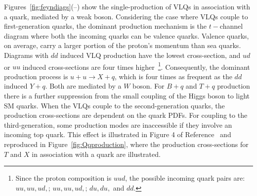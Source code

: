 Figures~\ref{fig:feyndiags}(--) show the single-production of VLQs in association with a quark, mediated by a weak boson. Considering the case where VLQs couple to first-generation quarks, the dominant production mechanism is the $t-$channel diagram where both the incoming quarks can be valence quarks. Valence quarks, on average, carry a larger portion of the proton's momentum than sea quarks. Diagrams with $dd$ induced VLQ production have the lowest cross-section, and $ud$ or $uu$ induced cross-sections are four times higher~\footnote{Since the proton composition is $uud$, the possible incoming quark pairs are: $uu, uu, ud,$; $uu, uu, ud,$; $du, du,$ and $dd$.}. Consequently, the dominant production process is $u + u \rightarrow X + q$, which is four times as frequent as the $dd$ induced $Y + q$. Both are mediated by a $W$ boson. For $B + q$ and $T + q$ production there is a further suppression from the small coupling of the Higgs boson to light SM quarks. When the VLQs couple to the second-generation quarks, the production cross-sections are dependent on the quark PDFs. For coupling to the third-generation, some production modes are inaccessible if they involve an incoming top quark. This effect is illustrated in Figure 4 of Reference~\cite{VLQ_contur} and reproduced in Figure~\ref{fig:Qqproduction}, where the production cross-sections for $T$ and $X$ in association with a quark are illustrated.
